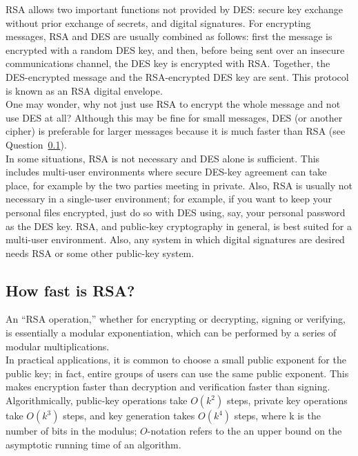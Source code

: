 RSA allows two important functions not provided by DES: secure key
exchange without prior exchange of secrets, and digital signatures. For
encrypting messages, RSA and DES are usually combined as follows: first
the message is encrypted with a random DES key, and then, before being
sent over an insecure communications channel, the DES key is encrypted
with RSA. Together, the DES-encrypted message and the RSA-encrypted DES
key are sent. This protocol is known as an RSA digital envelope.\\

One may wonder, why not just use RSA to encrypt the whole message and
not use DES at all? Although this may be fine for small messages, DES
(or another cipher) is preferable for larger messages because it is
much faster than RSA (see Question~\ref{how_fast_rsa}).\\

In some situations, RSA is not necessary and DES alone is sufficient.
This includes multi-user environments where secure DES-key agreement
can take place, for example by the two parties meeting in private.
Also, RSA is usually not necessary in a single-user environment; for
example, if you want to keep your personal files encrypted, just do so
with DES using, say, your personal password as the DES key. RSA, and
public-key cryptography in general, is best suited for a multi-user
environment. Also, any system in which digital signatures are desired
needs RSA or some other public-key system.

\subsection{How fast is RSA?}
\label{how_fast_rsa}

An ``RSA operation,'' whether for encrypting or decrypting, signing or
verifying, is essentially a modular exponentiation, which can be
performed by a series of modular multiplications.\\

In practical applications, it is common to choose a small public
exponent for the public key; in fact, entire groups of users can use
the same public exponent. This makes encryption faster than decryption
and verification faster than signing. Algorithmically, public-key
operations take $O(k^2)$ steps, private key operations take $O(k^3)$ steps,
and key generation takes $O(k^4)$ steps, where k is the number of bits in
the modulus; $O$-notation refers to the an upper bound on the asymptotic
running time of an algorithm.\\

